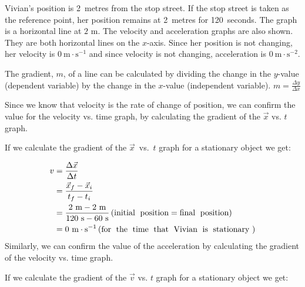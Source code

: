 Vivian's position is 2~metres from the stop street. If the stop street is taken as the reference point, her position remains at 2~metres for 120~seconds. The graph is a horizontal line at $2 \text{ m}$.
The velocity and acceleration graphs are also shown. They are both horizontal lines on the $x$-axis. Since her position is not changing, her velocity is $0~\text{m}\ensuremath{\cdot}\text{s}{}^{-1}$ and since velocity is not changing, acceleration is $0~\text{m}\ensuremath{\cdot}\text{s}{}^{-2}$.\par 


\par
{} {The gradient, $m$, of a line can be calculated by dividing the change in the $y$-value (dependent variable) by the change in the $x$-value (independent variable). $m = \frac{\Delta y}{\Delta x}$ \par  } 
        \label{m38795*id69281}Since we know that velocity is the rate of change of position, we can confirm the value for the velocity vs. time graph, by calculating the gradient of the $\vec{x}$ vs. $t$ graph.\par 
\label{m38795*notfhsst!!!underscore!!!id1870}
	\par
        \label{m38795*id69310}If we calculate the gradient of the $\vec{x}$~vs.~$t$ graph for a stationary object we get:\par 
        \label{m38795*id69332}\nopagebreak\noindent{}
    \begin{align*}
	v &= \frac{\Delta \vec{x}}{\Delta t}\\
	&= \frac{\vec{x}_{f}-\vec{x}_{i}}{{t}_{f}-{t}_{i}}\\
	&= \frac{2~\text{m}-2~\text{m}}{120~\text{s}-60~\text{s}} \left(\text{initial\; position}=\text{final\; position}\right)\\ 
	&= 0~\text{m}\ensuremath{\cdot}{\text{s}}^{-1}  \left(\text{for\; the\; time\; that\; Vivian\; is\; stationary}~\right) \\
      \end{align*}
        \label{m38795*id69558}Similarly, we can confirm the value of the acceleration by calculating the gradient of the velocity vs. time graph.\par 
\label{m38795*notfhsst!!!underscore!!!id2005}
	\par
        \label{m38795*id69571}If we calculate the gradient of the $\vec{v}$ vs. $t$ graph for a stationary object we get:\par 
        \label{m38795*id69594}\nopagebreak\noindent{}
          
